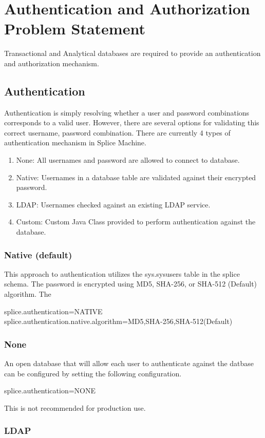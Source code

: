 \section{Authentication and Authorization Problem Statement}
Transactional and Analytical databases are required to provide an
authentication and authorization mechanism.

\subsection{Authentication}
Authentication is simply resolving whether a user and password combinations
corresponds to a valid user.  However, there are several options for validating
this correct username, password combination.  There are currently 4 types of
authentication mechanism in Splice Machine.

\begin{enumerate}
	\item None: All usernames and password are allowed to connect to database.
	\item Native: Usernames in a database table are validated against their
	encrypted password.
	\item LDAP: Usernames checked against an existing LDAP service.
	\item Custom: Custom Java Class provided to perform authentication against the
	database.
\end{enumerate}

\subsubsection{Native (default)}
This approach to authentication utilizes the sys.sysusers table in the splice
schema.  The password is encrypted using MD5, SHA-256, or
SHA-512 (Default) algorithm.  The 

splice.authentication=NATIVE
splice.authentication.native.algorithm=MD5,SHA-256,SHA-512(Default)


\subsubsection{None}
An open database that will allow each user to authenticate against the datbase
can be configured by setting the following configuration.

splice.authentication=NONE

This is not recommended for production use.

\subsubsection{LDAP}

